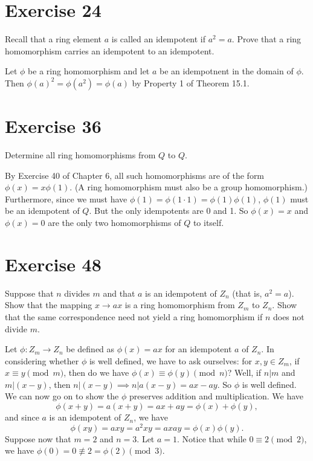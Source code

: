\documentclass[12pt]{article}
\begin{document}
\section*{Exercise 24}

Recall that a ring element $a$ is called an idempotent if $a^2=a$.
Prove that a ring homomorphism carries an idempotent to an idempotent.

Let $\phi$ be a ring homomorphism and let $a$ be an idempotnent
in the domain of $\phi$.  Then $\phi(a)^2=\phi(a^2)=\phi(a)$
by Property 1 of Theorem 15.1.

\section*{Exercise 36}

Determine all ring homomorphisms from $Q$ to $Q$.

By Exercise 40 of Chapter 6, all such homomorphisms are
of the form $\phi(x)=x\phi(1)$.  (A ring homomorphism must also
be a group homomorphism.)  Furthermore, since we must
have $\phi(1)=\phi(1\cdot 1)=\phi(1)\phi(1)$, $\phi(1)$ must be
an idempotent of $Q$.  But the only idempotents are 0 and 1.
So $\phi(x)=x$ and $\phi(x)=0$ are the only two homomorphisms
of $Q$ to itself.

\section*{Exercise 48}

Suppose that $n$ divides $m$ and that $a$ is an idempotent of $Z_n$ (that is,
$a^2=a$).  Show that the mapping $x\to ax$ is a ring homomorphism from $Z_m$
to $Z_n$.  Show that the same correspondence need not yield a ring homomorphism
if $n$ does not divide $m$.

Let $\phi:Z_m\to Z_n$ be defined as $\phi(x)=ax$ for an idempotent $a$ of $Z_n$.
In considering whether $\phi$ is well defined, we have to ask ourselves: for $x,y\in Z_m$,
if $x\equiv y\pmod m$, then do we have $\phi(x)\equiv\phi(y)\pmod n$?  Well, if $n|m$ and
$m|(x-y)$, then $n|(x-y)\implies n|a(x-y)=ax-ay$.  So $\phi$ is well defined.
We can now go on to show the $\phi$ preserves addition and multiplication.
We have
\begin{equation*}
\phi(x+y)=a(x+y)=ax+ay=\phi(x)+\phi(y),
\end{equation*}
and since $a$ is an idempotent of $Z_n$, we have
\begin{equation*}
\phi(xy)=axy=a^2xy=axay=\phi(x)\phi(y).
\end{equation*}
Suppose now that $m=2$ and $n=3$.  Let $a=1$.
Notice that while $0\equiv 2\pmod 2$, we have
$\phi(0)=0\not\equiv2=\phi(2)\pmod 3$.
\end{document}

